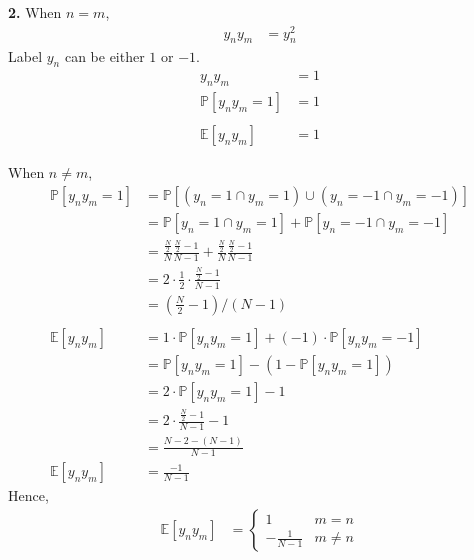 \documentclass[12pt]{article}
\begin{document}
\textbf{2.} When \(n = m\),
\begin{align}\nonumber
    y_ny_m & = y_n^2
\end{align}
Label \(y_n\) can be either \(1\) or \(-1\).
\begin{align}\nonumber
    y_ny_m & = 1 \\ \nonumber
    \mathbb{P}[y_ny_m = 1] & = 1 \\ \nonumber \\ \nonumber
    \mathbb{E}[y_ny_m] & = 1
\end{align}

When \(n \neq m\),
\begin{align} \nonumber
    \mathbb{P}[y_ny_m = 1] & = \mathbb{P}[(y_n = 1 \cap y_m = 1)\cup(y_n = -1 \cap y_m = -1)] \\ \nonumber
    & = \mathbb{P}[y_n = 1 \cap y_m = 1] + \mathbb{P} [y_n = -1 \cap y_m = -1] \\ \nonumber
    & = \frac{\frac{N}{2}}{N}\frac{\frac{N}{2}-1}{N-1} + \frac{\frac{N}{2}}{N}\frac{\frac{N}{2}-1}{N-1} \\ \nonumber
    & = 2\cdot\frac{1}{2}\cdot\frac{\frac{N}{2}-1}{N-1} \\ \nonumber
    & = ({\frac{N}{2}-1})/({N-1}) \\ \nonumber \\ \nonumber
    \mathbb{E}[y_ny_m] & = 1\cdot\mathbb{P}[y_ny_m = 1] + (-1)\cdot\mathbb{P}[y_ny_m = -1] \\ \nonumber
    & = \mathbb{P}[y_ny_m = 1] - (1 - \mathbb{P}[y_ny_m = 1]) \\ \nonumber
    & = 2\cdot\mathbb{P}[y_ny_m = 1] - 1 \\ \nonumber
    & = 2\cdot\frac{\frac{N}{2}-1}{N-1} - 1 \\ \nonumber
    & = \frac{N-2 -(N-1)}{N-1}\\ \nonumber
    \mathbb{E}[y_ny_m] & = \frac{-1}{N-1}
\end{align}
Hence,
\begin{align}
    \mathbb{E}[y_ny_m] & = 
    \begin{cases}
        1 & m = n\\
        -\frac{1}{N-1} & m\neq n
    \end{cases}
\end{align}
\end{document}
